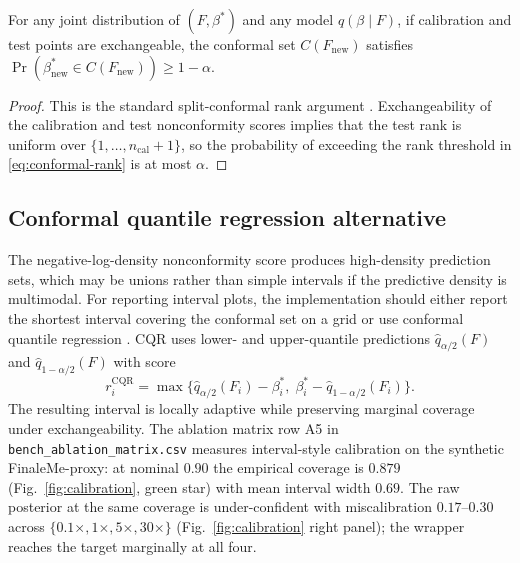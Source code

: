 \begin{proposition}
\label{prop:conformal}
For any joint distribution of $(F,\beta^*)$ and any model $q(\beta\mid F)$, if calibration and test points are exchangeable, the conformal set $C(F_{\mathrm{new}})$ satisfies $\Pr(\beta^*_{\mathrm{new}}\in C(F_{\mathrm{new}}))\ge 1-\alpha$.
\end{proposition}
\begin{proof}
This is the standard split-conformal rank argument \citep{vovk2005}. Exchangeability of the calibration and test nonconformity scores implies that the test rank is uniform over $\{1,\dots,n_{\mathrm{cal}}+1\}$, so the probability of exceeding the rank threshold in \eqref{eq:conformal-rank} is at most $\alpha$.
\end{proof}

\subsection{Conformal quantile regression alternative}
The negative-log-density nonconformity score produces high-density prediction sets, which may be unions rather than simple intervals if the predictive density is multimodal. For reporting interval plots, the implementation should either report the shortest interval covering the conformal set on a grid or use conformal quantile regression \citep{romano2019cqr}. CQR uses lower- and upper-quantile predictions $\hat q_{\alpha/2}(F)$ and $\hat q_{1-\alpha/2}(F)$ with score
\begin{equation}
r_i^{\mathrm{CQR}}=\max\big\{\hat q_{\alpha/2}(F_i)-\beta^*_i,\;\beta^*_i-\hat q_{1-\alpha/2}(F_i)\big\}.
\end{equation}
The resulting interval is locally adaptive while preserving marginal coverage under exchangeability. The ablation matrix row A5 in \texttt{bench\_ablation\_matrix.csv} measures interval-style calibration on the synthetic FinaleMe-proxy: at nominal $0.90$ the empirical coverage is $0.879$ (Fig.~\ref{fig:calibration}, green star) with mean interval width $0.69$. The raw posterior at the same coverage is under-confident with miscalibration $0.17$--$0.30$ across $\{0.1\times, 1\times, 5\times, 30\times\}$ (Fig.~\ref{fig:calibration} right panel); the wrapper reaches the target marginally at all four.

